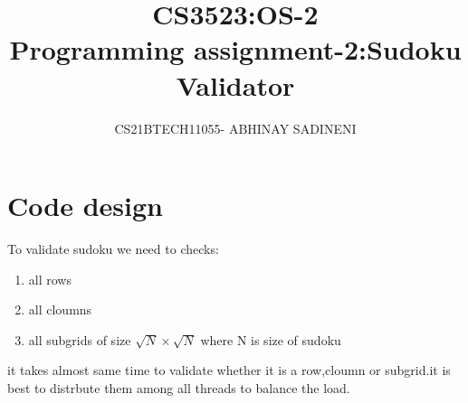 \documentclass[10pt,a4paper]{article}
\title{CS3523:OS-2 \\Programming assignment-2:Sudoku Validator}
\author{CS21BTECH11055- ABHINAY SADINENI}
\begin{document}
\maketitle
\section{Code design}
To validate sudoku we need to checks:
\begin{enumerate}
\item all rows
\item all cloumns
\item all subgrids of size $\sqrt{N}\times\sqrt{N}$ where N is size of sudoku
\end{enumerate}
it takes almost same time to validate whether it is a row,cloumn or  subgrid.it is best to distrbute them among all threads to balance the load. 
\end{document}
